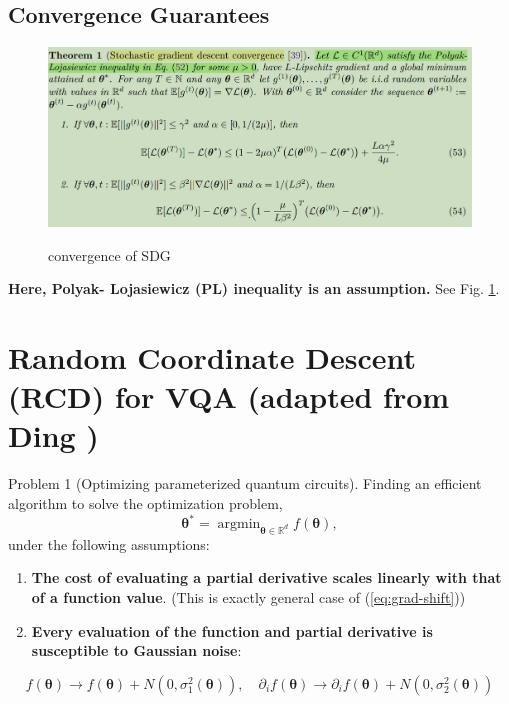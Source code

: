 \documentclass[
        11pt, %
	a4paper, %
]{LegrandOrangeBook}
\begin{document}
\subsection{Convergence Guarantees}

\begin{figure}
    \centering
    \includegraphics[width=1\linewidth]{Images/sgd-convergence.png}
    \label{fig:sgd-convergence}
    \caption{convergence of SDG}
\end{figure}

\textbf{Here, Polyak- Lojasiewicz (PL) inequality is an assumption.} See Fig. \ref{fig:sgd-convergence}.

\section{Random Coordinate Descent (RCD) for VQA (adapted from Ding \cite{ding2023random})}

\begin{problem}
    Problem 1 (Optimizing parameterized quantum circuits). Finding an efficient algorithm to solve the optimization problem,
\begin{equation}
    \boldsymbol{\theta}^*=\operatorname{argmin}_{\boldsymbol{\theta} \in \mathbb{R}^d} f(\boldsymbol{\theta}),
\end{equation}
under the following assumptions:
\begin{enumerate}
    \item \textbf{The cost of evaluating a partial derivative scales linearly with that of a function value}. (This is exactly general case of (\ref{eq:grad-shift}))
    \item \textbf{Every evaluation of the function and partial derivative is susceptible to Gaussian noise}:
\end{enumerate}
\begin{equation}
    f(\boldsymbol{\theta}) \rightarrow f(\boldsymbol{\theta})+N\left(0, \sigma_1^2(\boldsymbol{\theta})\right), \quad \partial_i f(\boldsymbol{\theta}) \rightarrow \partial_i f(\boldsymbol{\theta})+N\left(0, \sigma_2^2(\boldsymbol{\theta})\right)
\end{equation}
\end{problem}
\end{document}
